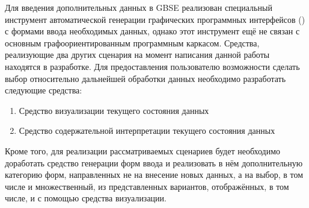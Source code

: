 Для введения дополнительных данных в GBSE реализован специальный инструмент автоматической генерации графических программных интерфейсов () с формами ввода необходимых данных\cite{SokolovPershin2017}, однако этот инструмент ещё не связан с основным графоориентированным программным каркасом. Средства, реализующие два других сценария на момент написания данной работы находятся в разработке. Для предоставления пользователю возможности сделать выбор относительно дальнейшей обработки данных необходимо разработать следующие средства:
\begin{enumerate}
    \item Средство визуализации текущего состояния данных
    \item Средство содержательной интерпретации текущего состояния данных
\end{enumerate}
Кроме того, для реализации рассматриваемых сценариев будет необходимо доработать средство генерации форм ввода и реализовать в нём дополнительную категорию форм, направленных не на внесение новых данных, а на выбор, в том числе и множественный, из представленных вариантов, отображённых, в том числе, и с помощью средства визуализации.